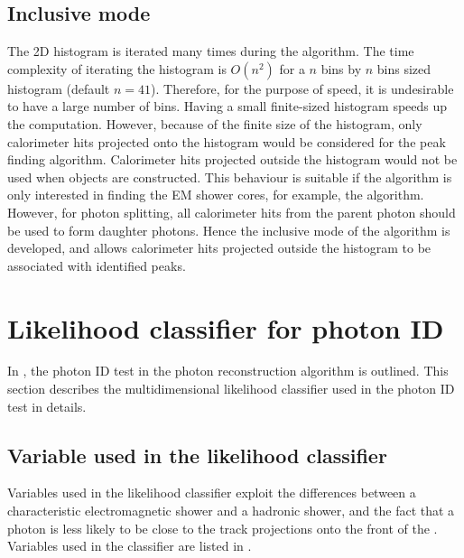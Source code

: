 \subsection{Inclusive mode}
\label{sec:photonPeakFindingInclusive}

The 2D histogram is iterated many times during the algorithm. The time complexity of iterating the histogram is $O(n^2)$ for a $n$ bins by  $n$ bins sized histogram (default $n = 41$). Therefore, for the purpose of speed, it is undesirable to have  a large number of bins. Having a small finite-sized histogram speeds up the computation. However, because of the finite size of the histogram, only  calorimeter hits  projected onto the histogram would be considered for the peak finding algorithm. Calorimeter hits projected outside the histogram would not be used when \ShowerPeak objects are constructed. This behaviour is suitable if the algorithm is only interested in finding the EM shower cores, for example, the \PhotonReconstruction algorithm. However, for photon splitting, all calorimeter hits from the parent photon should be used to form daughter photons. Hence the inclusive mode of the \peakFinding algorithm is developed, and allows calorimeter hits projected outside the histogram to be associated with identified peaks.


\section{Likelihood classifier for photon ID}
\label{sec:photonLikelihood}

In , the photon ID test in the photon reconstruction algorithm is outlined. This section describes the multidimensional likelihood classifier used in the photon ID test in details.


\subsection{Variable used in the likelihood classifier}

Variables used in the likelihood classifier exploit the differences between a characteristic electromagnetic shower and a hadronic shower, and the fact that a photon is less likely to be close to the track projections onto the front of the \ECAL. Variables used in the classifier are listed in .

